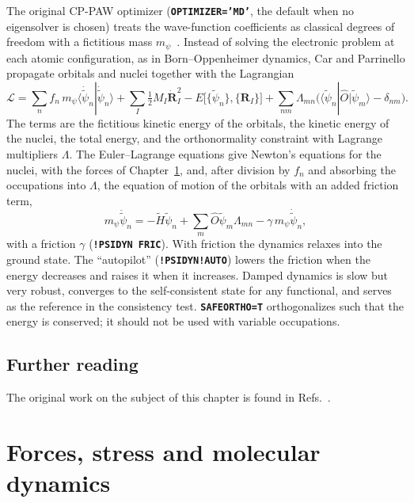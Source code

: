 \documentclass[11pt,a4paper,oneside]{book}
\newcommand{\key}[1]{\textbf{\texttt{#1}}}
\newcommand{\bra}[1]{\langle #1|}
\newcommand{\ket}[1]{|#1\rangle}
\newcommand{\braket}[2]{\langle #1|#2\rangle}
\begin{document}
The original CP-PAW optimizer (\key{OPTIMIZER='MD'}, the default when no
eigensolver is chosen) treats the wave-function coefficients as classical
degrees of freedom with a fictitious mass $m_\psi$~\cite{CarParrinello1985}.
Instead of solving the electronic problem at each atomic configuration,
as in Born--Oppenheimer dynamics, Car and Parrinello propagate orbitals
and nuclei together with the Lagrangian
\begin{equation}
  \mathcal L=\sum_n f_n\,m_\psi\braket{\dot{\tilde\psi}_n}{\dot{\tilde\psi}_n}
  +\sum_I\tfrac12M_I\dot{\bm R}_I^2
  -E\bigl[\{\tilde\psi_n\},\{\bm R_I\}\bigr]
  +\sum_{nm}\Lambda_{mn}\bigl(\bra{\tilde\psi_n}\hat O\ket{\tilde\psi_m}-\delta_{nm}\bigr).
\end{equation}
The terms are the fictitious kinetic energy of the orbitals, the kinetic
energy of the nuclei, the total energy, and the orthonormality
constraint with Lagrange multipliers $\Lambda$. The Euler--Lagrange
equations give Newton's equations for the nuclei, with the forces of
Chapter~\ref{chap:forces}, and, after division by $f_n$ and absorbing
the occupations into $\Lambda$, the equation of motion of the orbitals
with an added friction term,
\begin{equation}
  m_\psi\ddot{\tilde\psi}_n=-\tilde H\tilde\psi_n
  +\sum_m\hat O\tilde\psi_m\Lambda_{mn}-\gamma\,m_\psi\dot{\tilde\psi}_n,
\end{equation}
with a friction $\gamma$ (\key{!PSIDYN FRIC}). With friction the dynamics
relaxes into the ground state. The ``autopilot'' (\key{!PSIDYN!AUTO})
lowers the friction when the energy decreases and raises it when it
increases. Damped dynamics is slow but very robust, converges to the
self-consistent state for any functional, and serves as the reference
in the consistency test. \key{SAFEORTHO=T} orthogonalizes such that the
energy is conserved; it should not be used with variable occupations.


\section*{Further reading}
The original work on the subject of this chapter is found in
Refs.~\cite{Davidson1975,WoodZunger1985,KresseFurthmuller1996PRB,Payne1992,CarParrinello1985}.

\chapter{Forces, stress and molecular dynamics}\label{chap:forces}
\minitoc
\end{document}

